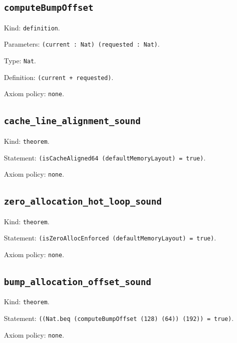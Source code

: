 \documentclass[11pt]{article}
\begin{document}
\subsection*{\texttt{computeBumpOffset}}
\noindent Kind: \texttt{definition}.\par
\noindent Parameters: \texttt{(current : Nat) (requested : Nat)}.\par
\noindent Type: \texttt{Nat}.\par
\noindent Definition: \texttt{(current + requested)}.\par
\noindent Axiom policy: \texttt{none}.\par
\subsection*{\texttt{cache\_line\_alignment\_sound}}
\noindent Kind: \texttt{theorem}.\par
\noindent Statement: \texttt{(isCacheAligned64 (defaultMemoryLayout) = true)}.\par
\noindent Axiom policy: \texttt{none}.\par
\subsection*{\texttt{zero\_allocation\_hot\_loop\_sound}}
\noindent Kind: \texttt{theorem}.\par
\noindent Statement: \texttt{(isZeroAllocEnforced (defaultMemoryLayout) = true)}.\par
\noindent Axiom policy: \texttt{none}.\par
\subsection*{\texttt{bump\_allocation\_offset\_sound}}
\noindent Kind: \texttt{theorem}.\par
\noindent Statement: \texttt{((Nat.beq (computeBumpOffset (128) (64)) (192)) = true)}.\par
\noindent Axiom policy: \texttt{none}.\par
\end{document}

